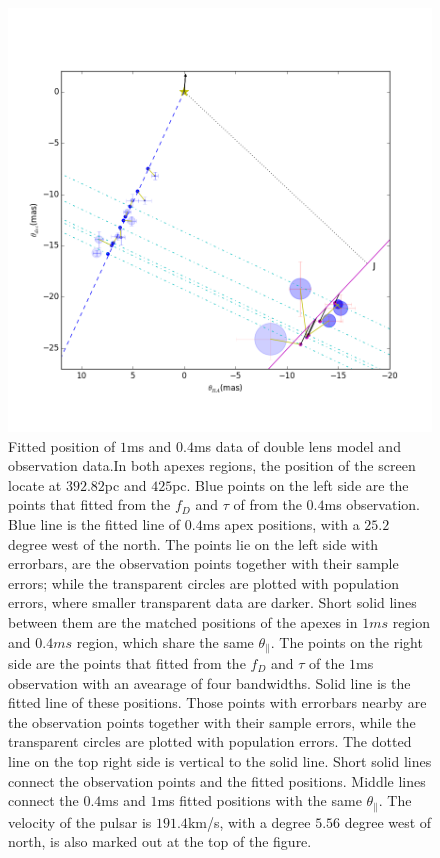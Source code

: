 \documentclass[useAMS,usenatbib]{mn2e}
\begin{document}
\begin{figure}
\centering
\includegraphics[width=1.0\textwidth, angle=0]{Double_lens_640_425_392.png}
\caption{Fitted position of $1$ms and $0.4$ms data of double lens model and observation data.In both apexes regions, the position of the screen locate at $392.82$pc and $425$pc. Blue points on the left side are the points that fitted from the $f_D$ and $\tau$ of from the $0.4$ms observation. Blue line is the fitted line of $0.4$ms apex positions, with a $25.2$ degree west of the north. The points lie on the left side with errorbars, are the observation points together with their sample errors; while the transparent circles are plotted with population errors, where smaller transparent data are darker. Short solid lines between them are the matched positions of the apexes in $1ms$ region and $0.4ms$ region, which share the same $\theta_{\parallel}$. The points on the right side are the points that fitted from the $f_D$ and $\tau$ of the $1$ms observation with an avearage of four bandwidths. Solid line is the fitted line of these positions. Those points with errorbars nearby are the observation points together with their sample errors, while the transparent circles are plotted with population errors. The dotted line on the top right side is vertical to the solid line. Short solid lines connect the observation points and the fitted positions. Middle lines connect the $0.4$ms and $1$ms fitted positions with the same $\theta_{\parallel}$. The velocity of the pulsar is $191.4$km/s, with a degree $5.56$ degree west of north, is also marked out at the top of the figure.  }
\label{Doublelens}
\end{figure}
\end{document}
